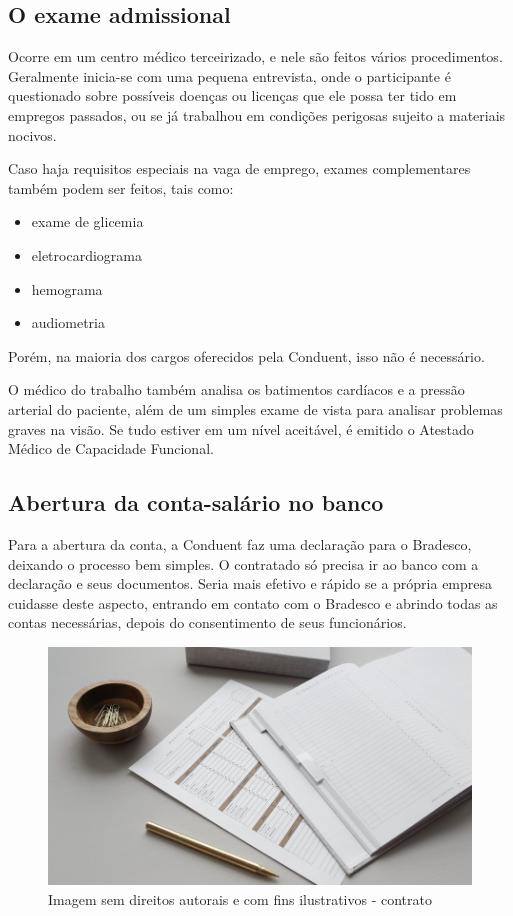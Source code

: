 \documentclass[12pt]{article}
\begin{document}
\newpage

\subsection{O exame admissional}

Ocorre em um centro médico terceirizado, e nele são feitos vários procedimentos. Geralmente inicia-se com uma pequena entrevista, onde o participante é questionado sobre possíveis doenças ou licenças que ele possa ter tido em empregos passados, ou se já trabalhou em condições perigosas sujeito a materiais nocivos. 

Caso haja requisitos especiais na vaga de emprego, exames complementares também podem ser feitos, tais como: 

\begin{itemize}
\item exame de glicemia
\item eletrocardiograma
\item hemograma
\item audiometria

\end{itemize}

 Porém, na maioria dos cargos oferecidos pela Conduent, isso não é necessário.

O médico do trabalho também analisa os batimentos cardíacos e a pressão arterial do paciente, além de um simples exame de vista para analisar problemas graves na visão. Se tudo estiver em um nível aceitável, é emitido o Atestado Médico de Capacidade Funcional.

\newpage
\subsection{Abertura da conta-salário no banco}

Para a abertura da conta, a Conduent faz uma declaração para o Bradesco, deixando o processo bem simples. O contratado só precisa ir ao banco com a declaração e seus documentos. Seria mais efetivo e rápido se a própria empresa cuidasse deste aspecto, entrando em contato com o Bradesco e abrindo todas as contas necessárias, depois do consentimento de seus funcionários.


\begin{figure}[h]
	\centering
	\includegraphics[scale=0.4]{build/images/fazendoconta.jpg}
	\caption{Imagem sem direitos autorais e com fins ilustrativos - contrato}
	\label{fig:mesh1}
\end{figure}
\end{document}
